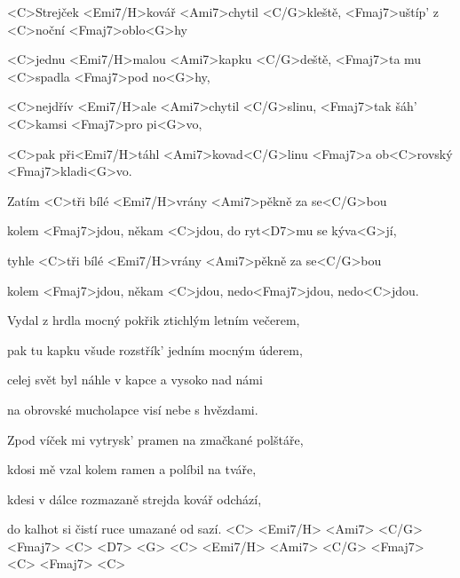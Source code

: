 

\zs
<C>Strejček <Emi7/H>kovář <Ami7>chytil <C/G>kleště, 
<Fmaj7>uštíp' z <C>noční <Fmaj7>oblo<G>hy

<C>jednu <Emi7/H>malou <Ami7>kapku <C/G>deště, 
<Fmaj7>ta mu <C>spadla <Fmaj7>pod no<G>hy,

<C>nejdřív <Emi7/H>ale <Ami7>chytil <C/G>slinu, 
<Fmaj7>tak šáh' <C>kamsi <Fmaj7>pro pi<G>vo,

<C>pak při<Emi7/H>táhl <Ami7>kovad<C/G>linu <Fmaj7>a 
ob<C>rovský <Fmaj7>kladi<G>vo.
\ks

\zr
Zatím <C>tři bílé <Emi7/H>vrány <Ami7>pěkně za se<C/G>bou

kolem <Fmaj7>jdou, někam <C>jdou, do ryt<D7>mu se 
kýva<G>jí,

tyhle <C>tři bílé <Emi7/H>vrány <Ami7>pěkně za se<C/G>bou

kolem <Fmaj7>jdou, někam <C>jdou, nedo<Fmaj7>jdou, 
nedo<C>jdou.
\kr

\zs
Vydal z hrdla mocný pokřik ztichlým letním večerem,

pak tu kapku všude rozstřík' jedním mocným úderem,

celej svět byl náhle v kapce a vysoko nad námi

na obrovské mucholapce visí nebe s hvězdami.
\ks

\zr \kr

\zs
Zpod víček mi vytrysk' pramen na zmačkané polštáře,

kdosi mě vzal kolem ramen a políbil na tváře,

kdesi v dálce rozmazaně strejda kovář odchází,

do kalhot si čistí ruce umazané od sazí.
\ks
<C> <Emi7/H> <Ami7> <C/G> <Fmaj7> <C> <D7> <G> <C> <Emi7/H> <Ami7> <C/G> <Fmaj7> <C> <Fmaj7> <C>

\kp
